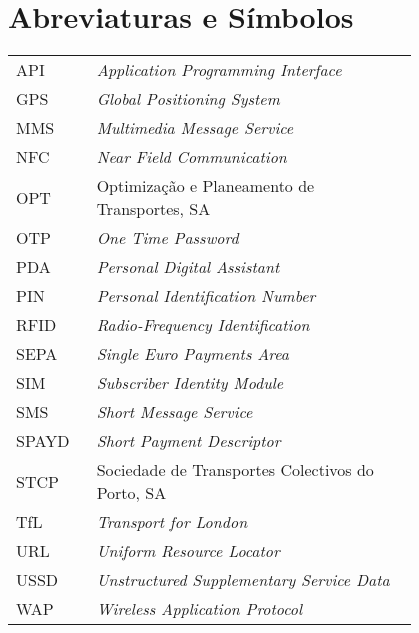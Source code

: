 \chapter*{Abreviaturas e Símbolos}

\begin{flushleft}
\begin{tabular}{l p{0.8\linewidth}}
API & \textit{Application Programming Interface}\\
GPS & \textit{Global Positioning System}\\
MMS & \textit{Multimedia Message Service}\\
NFC & \textit{Near Field Communication}\\
OPT & Optimização e Planeamento de Transportes, SA\\
OTP & \textit{One Time Password}\\
PDA & \textit{Personal Digital Assistant}\\
PIN & \textit{Personal Identification Number}\\
RFID & \textit{Radio-Frequency Identification}\\
SEPA & \textit{Single Euro Payments Area}\\
SIM & \textit{Subscriber Identity Module}\\
SMS & \textit{Short Message Service}\\
SPAYD & \textit{Short Payment Descriptor}\\
STCP & Sociedade de Transportes Colectivos do Porto, SA\\
TfL & \textit{Transport for London}\\
URL & \textit{Uniform Resource Locator}\\
USSD & \textit{Unstructured Supplementary Service Data}\\
WAP & \textit{Wireless Application Protocol}
\end{tabular}
\end{flushleft}

